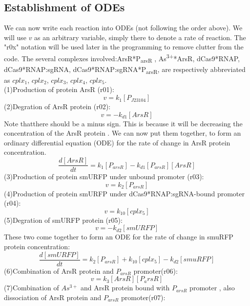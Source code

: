 \subsection{Establishment of ODEs}
We can now write each reaction into ODEs (not following the order above). We will use $v$ as an arbitrary variable, simply there to denote a rate of reaction. The "r0x" notation will be used later in the programming to remove clutter from the code. The several complexes involved:ArsR*P\textsubscript{arsR} , As\textsuperscript{3+}*ArsR, dCas9*RNAP, dCas9*RNAP:sgRNA, dCas9*RNAP:sgRNA*P\textsubscript{arsR}, are respectively abbreviated as $cplx_1$, $cplx_2$, $cplx_3$, $cplx_4$, $cplx_5$.\\
(1)Production of protein ArsR (r01):
\begin{displaymath}
v=k_1[P_{J23104}]
\end{displaymath}
(2)Degration of ArsR protein (r02):
\begin{displaymath}
v=-k_{d1}[ArsR]
\end{displaymath}
Note thatthere should be a minus sign. This is because it will be decreasing the concentration of the ArsR protein . We can now put them together, to form an ordinary differential equation (ODE) for the rate of change in ArsR protein concentration.
\begin{equation}
\frac{d[ArsR]}{dt}=k_1[P_{arsR}]-k_{d1}[P_{arsR}][ArsR]\tag{1}
\end{equation}
(3)Production of protein smURFP under unbound promoter (r03):
\begin{displaymath}
v=k_2[P_{arsR}]
\end{displaymath}
(4)Production of protein smURFP under dCas9*RNAP:sgRNA-bound promoter (r04):
\begin{displaymath}
v=k_{10}[cplx_5]
\end{displaymath}
(5)Degration of smURFP protein (r05):
\begin{displaymath}
v=-k_{d2}[smURFP]
\end{displaymath}
These two come together to form an ODE for the rate of change in smuRFP protein concentration:
\begin{equation}
\frac{d[smURFP]}{dt}=k_2[P_{arsR}]+k_{10}[cplx_5]-k_{d2}[smuRFP]\tag{2}
\end{equation}
(6)Combination of ArsR protein and $P_{arsR}$ promoter(r06):
\begin{displaymath}
v=k_3[ArsR][P_arsR]
\end{displaymath}
(7)Combination of $As^{3+}$ and ArsR protein bound with $P_{arsR}$ promoter , also dissociation of ArsR protein and $P_{arsR}$ promoter(r07):
